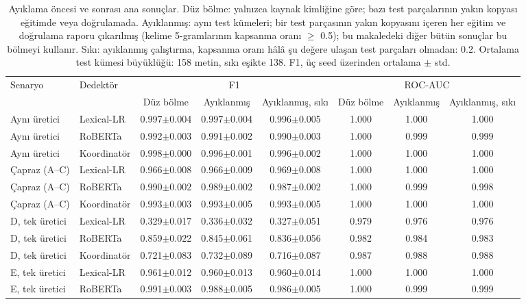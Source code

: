\begin{table}[t]
\centering
\scriptsize
\caption{Ayıklama öncesi ve sonrası ana sonuçlar. Düz bölme: yalnızca kaynak kimliğine göre; bazı test parçalarının yakın kopyası eğitimde veya doğrulamada. Ayıklanmış: aynı test kümeleri; bir test parçasının yakın kopyasını içeren her eğitim ve doğrulama raporu çıkarılmış (kelime 5-gramlarının kapsanma oranı $\geq$ 0.5); bu makaledeki diğer bütün sonuçlar bu bölmeyi kullanır. Sıkı: ayıklanmış çalıştırma, kapsanma oranı hâlâ şu değere ulaşan test parçaları olmadan: 0.2. Ortalama test kümesi büyüklüğü: 158 metin, sıkı eşikte 138. F1, üç seed üzerinden ortalama $\pm$ std.}
\label{tab:leakage}
\begin{tabular}{llcccccc}
\toprule
Senaryo & Dedektör & \multicolumn{3}{c}{F1} & \multicolumn{3}{c}{ROC-AUC} \\
\cmidrule(lr){3-5}\cmidrule(lr){6-8}
 & & Düz bölme & Ayıklanmış & Ayıklanmış, sıkı & Düz bölme & Ayıklanmış & Ayıklanmış, sıkı \\
\midrule
Aynı üretici & Lexical-LR & 0.997$\pm$0.004 & 0.997$\pm$0.004 & 0.996$\pm$0.005 & 1.000 & 1.000 & 1.000 \\
Aynı üretici & RoBERTa & 0.992$\pm$0.003 & 0.991$\pm$0.002 & 0.990$\pm$0.003 & 1.000 & 0.999 & 0.999 \\
Aynı üretici & Koordinatör & 0.998$\pm$0.000 & 0.996$\pm$0.001 & 0.996$\pm$0.002 & 1.000 & 1.000 & 1.000 \\
Çapraz (A--C) & Lexical-LR & 0.966$\pm$0.008 & 0.966$\pm$0.009 & 0.969$\pm$0.008 & 1.000 & 1.000 & 1.000 \\
Çapraz (A--C) & RoBERTa & 0.990$\pm$0.002 & 0.989$\pm$0.002 & 0.987$\pm$0.002 & 1.000 & 0.999 & 0.998 \\
Çapraz (A--C) & Koordinatör & 0.993$\pm$0.003 & 0.993$\pm$0.005 & 0.993$\pm$0.005 & 1.000 & 1.000 & 1.000 \\
D, tek üretici & Lexical-LR & 0.329$\pm$0.017 & 0.336$\pm$0.032 & 0.327$\pm$0.051 & 0.979 & 0.976 & 0.976 \\
D, tek üretici & RoBERTa & 0.859$\pm$0.022 & 0.845$\pm$0.061 & 0.836$\pm$0.056 & 0.982 & 0.984 & 0.983 \\
D, tek üretici & Koordinatör & 0.721$\pm$0.083 & 0.732$\pm$0.089 & 0.716$\pm$0.087 & 0.987 & 0.988 & 0.988 \\
E, tek üretici & Lexical-LR & 0.961$\pm$0.012 & 0.960$\pm$0.013 & 0.960$\pm$0.014 & 1.000 & 1.000 & 1.000 \\
E, tek üretici & RoBERTa & 0.991$\pm$0.003 & 0.988$\pm$0.005 & 0.986$\pm$0.005 & 1.000 & 0.999 & 0.999 \\

\end{tabular}
\end{table}
